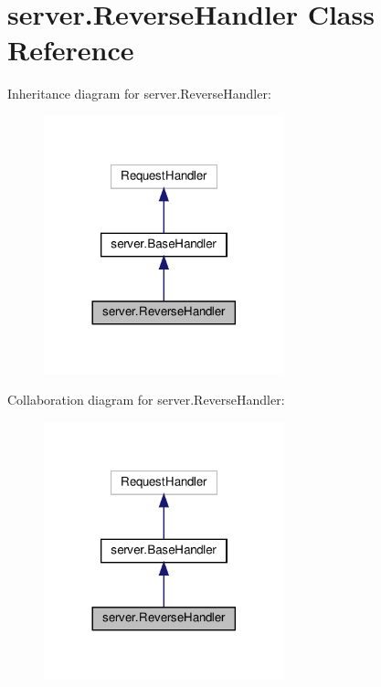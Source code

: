 \hypertarget{classserver_1_1ReverseHandler}{}\section{server.\+Reverse\+Handler Class Reference}
\label{classserver_1_1ReverseHandler}


Inheritance diagram for server.\+Reverse\+Handler\+:
\nopagebreak
\begin{figure}[H]
\begin{center}
\leavevmode
\includegraphics[width=197pt]{classserver_1_1ReverseHandler__inherit__graph}
\end{center}
\end{figure}


Collaboration diagram for server.\+Reverse\+Handler\+:
\nopagebreak
\begin{figure}[H]
\begin{center}
\leavevmode
\includegraphics[width=197pt]{classserver_1_1ReverseHandler__coll__graph}
\end{center}
\end{figure}
